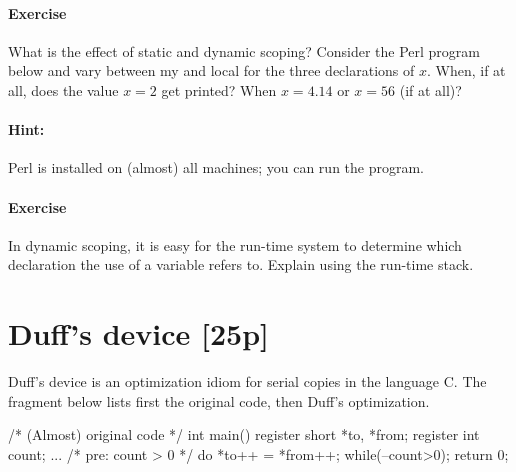 \documentclass{article}
\newcommand{\mycomment}[1]{}
\newcommand{\percent}[1]{\protect \marginpar[l]{\bf [#1 points]}}
\newcounter{question}
\newenvironment{question}[1]{
  \addtocounter{question}{1}
  \paragraph{Exercise~\arabic{question}  \percent{#1}}
}{
  \vfil
}
\begin{document}
\begin{question}{X}
  What is the effect of static and dynamic scoping? Consider the Perl
  program below and vary between \textsf{my} and \textsf{local} for the
  three declarations of $x$. When, if at all, does the value $x=2$ get
  printed? When $x=4.14$ or $x=56$ (if at all)?
\end{question}

\paragraph{Hint:}
Perl is installed on (almost) all machines; you can run the program.

\begin{question}{X}
  In dynamic scoping, it is easy for the run-time system to determine
  which declaration the use of a variable refers to. Explain using the
  run-time stack.  
\end{question}

\mycomment{
Static scoping with non-local references, on the other hand,
is not so easy to implement. In particular, the kind of 
activation records discussed in class (which contain
only two kinds of internal information: the return address and the previous
activation record) does not suffice. 
%

What information would be necessary and where could it be stored? 
Make a suggestion  and 
sketch a (simple) algorithm that takes a run-time stack and an activation record,
and returns the ``right'' reference (or at least its activation record).
How expensive is your algorithm? Determine the parameters on which its
cost depends and give the cost of the algorithm.
}

\newpage 
\section{Duff's device [25p]}
Duff's device is an optimization idiom for serial copies 
in the language C. The fragment below lists first the original code,
then Duff's optimization.
\begin{cplus}
/* (Almost) original code */
int main() {
   register short *to, *from;
   register int count;	
   ... 
   {
     /* pre: count > 0 */		
     do
	  *to++ = *from++;		
     while(--count>0);	
   }
   return 0; 
}

\end{cplus}
\end{document}
